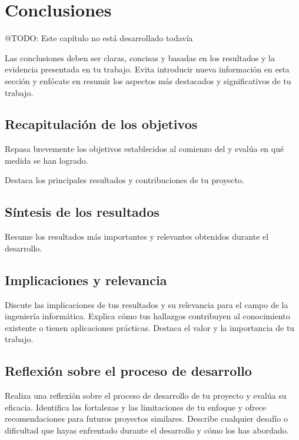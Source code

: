 \chapter{Conclusiones}\label{ch:chapter_6}

\colorbox{color_highlight}{@TODO: Este capítulo no está desarrollado todavía}

Las conclusiones deben ser claras, concisas y basadas en los resultados y la evidencia presentada en tu trabajo.
Evita introducir nueva información en esta sección y enfócate en
resumir los aspectos más destacados y significativos de tu trabajo.


\section{Recapitulación de los objetivos}

Repasa brevemente los objetivos establecidos al comienzo del y evalúa en qué medida se
han logrado.

Destaca los principales resultados y contribuciones de tu proyecto.


\section{Síntesis de los resultados}

Resume los resultados más importantes y relevantes obtenidos durante el desarrollo.


\section{Implicaciones y relevancia}


Discute las implicaciones de tus resultados y su relevancia para el campo
de la ingeniería informática.
Explica cómo tus hallazgos contribuyen al conocimiento existente o tienen aplicaciones prácticas.
Destaca el valor y la importancia de tu trabajo.


\section{Reflexión sobre el proceso de desarrollo}

Realiza una reflexión sobre el proceso de desarrollo de tu proyecto y evalúa
su eficacia.
Identifica las fortalezas y las limitaciones de tu enfoque y ofrece recomendaciones para futuros proyectos similares.
Describe cualquier desafío o dificultad que hayas enfrentado durante el desarrollo y cómo los has abordado.


